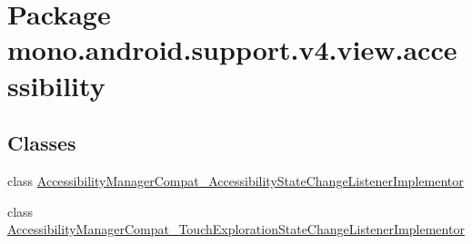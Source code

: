 \hypertarget{namespacemono_1_1android_1_1support_1_1v4_1_1view_1_1accessibility}{
\section{Package mono.android.support.v4.view.accessibility}
\label{namespacemono_1_1android_1_1support_1_1v4_1_1view_1_1accessibility}
}
\subsection*{Classes}
\begin{CompactItemize}
\item 
class \hyperlink{classmono_1_1android_1_1support_1_1v4_1_1view_1_1accessibility_1_1_accessibility_manager_compat_18265d54b1862e339153b0dd9ae68d99}{AccessibilityManagerCompat\_\-AccessibilityStateChangeListenerImplementor}
\item 
class \hyperlink{classmono_1_1android_1_1support_1_1v4_1_1view_1_1accessibility_1_1_accessibility_manager_compat_9bd6a396809ffec70e161c1567d2a373}{AccessibilityManagerCompat\_\-TouchExplorationStateChangeListenerImplementor}
\end{CompactItemize}

